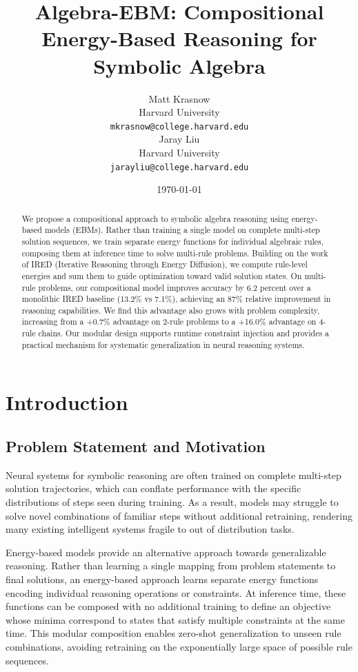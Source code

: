 \documentclass{article}
\title{Algebra-EBM: Compositional Energy-Based Reasoning for Symbolic Algebra}
\author{
    Matt Krasnow \\
    Harvard University \\
    \texttt{mkrasnow@college.harvard.edu} \\
    \And
    Jaray Liu \\
    Harvard University\\
    \texttt{jarayliu@college.harvard.edu}
}
\date{\today}
\begin{document}
\maketitle

\begin{abstract}
    We propose a compositional approach to symbolic algebra reasoning using energy-based models (EBMs). Rather than training a single model on complete multi-step solution sequences, we train separate energy functions for individual algebraic rules, composing them at inference time to solve multi-rule problems. Building on the work of IRED (Iterative Reasoning through Energy Diffusion), we compute rule-level energies and sum them to guide optimization toward valid solution states. On multi-rule problems, our compositional model improves accuracy by 6.2 percent over a monolithic IRED baseline (13.2\% vs 7.1\%), achieving an 87\% relative improvement in reasoning capabilities. We find this advantage also grows with problem complexity, increasing from a +0.7\% advantage on 2-rule problems to a +16.0\% advantage on 4-rule chains. Our modular design supports runtime constraint injection and provides a practical mechanism for systematic generalization in neural reasoning systems.
\end{abstract}

\section{Introduction}

\subsection{Problem Statement and Motivation}

Neural systems for symbolic reasoning are often trained on complete multi-step solution trajectories, which can conflate performance with the specific distributions of steps seen during training. As a result, models may struggle to solve novel combinations of familiar steps without additional retraining, rendering many existing intelligent systems fragile to out of distribution tasks.

Energy-based models provide an alternative approach towards generalizable reasoning. Rather than learning a single mapping from problem statements to final solutions, an energy-based approach learns separate energy functions encoding individual reasoning operations or constraints. At inference time, these functions can be composed with no additional training to define an objective whose minima correspond to states that satisfy multiple constraints at the same time. This modular composition enables zero-shot generalization to unseen rule combinations, avoiding retraining on the exponentially large space of possible rule sequences.
\end{document}

